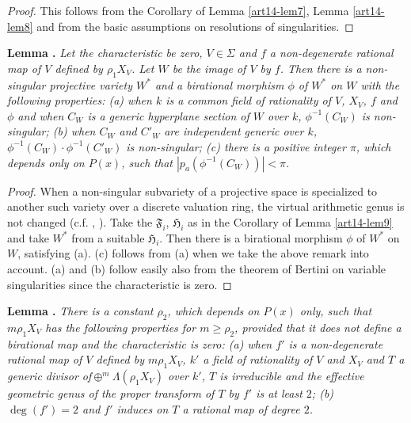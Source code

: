 \begin{proof}
This follows from the Corollary of Lemma \ref{art14-lem7}, Lemma \ref{art14-lem8} and from the basic assumptions on resolutions of singularities.
\end{proof}

\medskip
\noindent
{\bf Lemma .\label{art14-lem10}}
{\em 
Let the characteristic be zero, $V\in\Sigma$ and $f$ a non-degene\-rate rational map of $V$ defined by $\rho_{1}X_{V}$. Let $W$ be the image of $V$ by $f$. Then there is a non-singular projective variety $W^{*}$ and a birational morphism $\phi$ of $W^{*}$ on $W$ with the following properties: {\rm(a)} when $k$ is a common field of rationality of $V$, $X_{V}$, $f$ and $\phi$ and when $C_{W}$ is a generic hyperplane section of $W$ over $k$, $\phi^{-1}(C_{W})$ is non-singular; {\rm(b)} when $C_{W}$ and $C'_{W}$ are independent generic over $k$, $\phi^{-1}(C_{W})\cdot \phi^{-1}(C'_{W})$ is non-singular; {\rm(c)} there is a positive integer $\pi$, which depends only on $P(x)$, such that $|p_{a}(\phi^{-1}(C_{W}))|<\pi$.}

\begin{proof}
When a non-singular subvariety of a projective space is specialized to another such variety over a discrete valuation ring, the virtual arithmetic genus is not changed (c.f. \cite{art14-key2}, \cite{art14-key4}). Take the $\mathfrak{F}_{i}$, $\mathfrak{H}_{i}$ as in the Corollary of Lemma \ref{art14-lem9} and take $W^{*}$ from a suitable $\mathfrak{H}_{i}$. Then there is a birational morphism $\phi$ of $W^{*}$ on $W$, satisfying (a). (c) follows from (a) when we take the above remark into account. (a) and (b) follow easily also from the theorem of Bertini on variable singularities since the characteristic is zero.
\end{proof}

\medskip
\noindent
{\bf Lemma .\label{art14-lem11}}
{\em There is a constant $\rho_{2}$, which depends on $P(x)$ only, such that $m\rho_{1}X_{V}$ has the following properties for $m\geq \rho_{2}$, provided that it does not define a birational map and the characteristic is zero: {\rm(a)} when $f'$ is a non-degenerate rational map of $V$ defined by $m\rho_{1}X_{V}$, $k'$ a field of rationality of $V$ and $X_{V}$ and $T$ a generic divisor of\pageoriginale $\oplus^{m}\Lambda(\rho_{1}X_{V})$ over $k'$, $T$ is irreducible and the effective geometric genus of the proper transform of $T$ by $f'$ is at least $2$; {\rm(b)} $\deg (f')=2$ and $f'$ induces on $T$ a rational map of degree $2$.}

